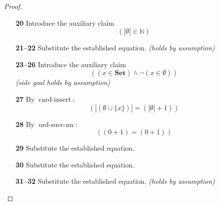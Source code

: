 \documentclass[11pt]{article}
\theoremstyle{plain}
\begin{document}
\begin{proof}
\begin{itemize}[leftmargin=2.8em, itemsep=4pt, parsep=1pt]
  \item[\textbf{20}] Introduce the auxiliary claim
\begin{equation*}
(|\emptyset| \in \mathbb{N})
\end{equation*}

  \item[\textbf{21--22}] Substitute the established equation.  \emph{(holds by assumption)}
  \item[\textbf{23--26}] Introduce the auxiliary claim
\begin{equation*}
((x \in \mathbf{Set}) \wedge \neg (x \in \emptyset))
\end{equation*}
  \emph{(side goal holds by assumption)}
  \item[\textbf{27}] By $\operatorname{card\text{-}insert}$:
\begin{equation*}
(|(\emptyset \cup \{x\})| = (|\emptyset| + 1))
\end{equation*}

  \item[\textbf{28}] By $\operatorname{ord\text{-}succ\text{-}nn}$:
\begin{equation*}
((0 + 1) = (0 + 1))
\end{equation*}

  \item[\textbf{29}] Substitute the established equation.
  \item[\textbf{30}] Substitute the established equation.
  \item[\textbf{31--32}] Substitute the established equation.  \emph{(holds by assumption)}
\end{itemize}
\end{proof}

\bigskip
\end{document}
